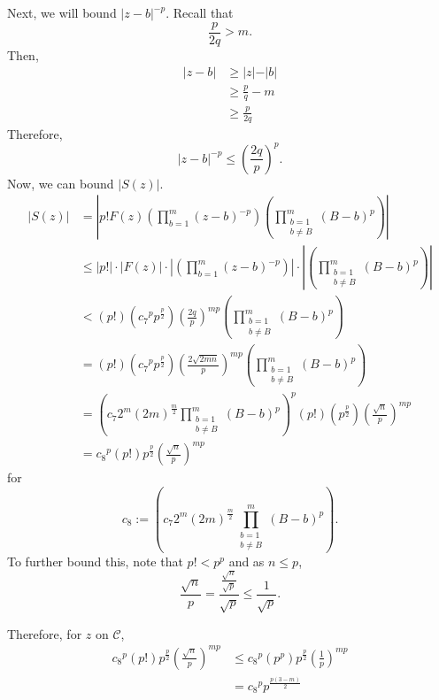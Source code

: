 \documentclass[a4paper, 11pt]{book}
\begin{document}
Next, we will bound ${\vert z - b \vert}^{-p}$. Recall that \[\frac{p}{2q} > m.\] Then,
\begin{align*}
    \vert z - b \vert &\geq \vert z \vert - \vert b \vert \\
                      &\geq \frac{p}{q} - m \\
                      &\geq \frac{p}{2q}
\end{align*}
Therefore, \[{\vert z - b \vert}^{-p} \leq {\left(\frac{2q}{p}\right)}^{p}.\] Now, we can bound $\vert S(z) \vert$.
\begin{align*}
    \vert S(z) \vert &= \left\vert p! F(z) \left(\prod\limits_{b=1}^{m} {(z - b)}^{-p}\right)\left(\prod\limits_{\substack {b = 1 \\ b \neq B}}^{m} {(B - b)}^{p}\right) \right\vert \\
                     &\leq \left\vert p!\right\vert \cdot \left\vert F(z)\right\vert \cdot \left\vert \left(\prod\limits_{b=1}^{m} {(z - b)}^{-p}\right)\right\vert \cdot \left\vert \left(\prod\limits_{\substack {b = 1 \\ b \neq B}}^{m} {(B - b)}^{p}\right) \right\vert \\
                     &< (p!)\left({c_7}^{p}{p}^{\frac{p}{2}}\right){\left(\frac{2q}{p}\right)}^{mp}\left(\prod\limits_{\substack {b = 1 \\ b \neq B}}^{m} {(B - b)}^{p}\right) \\
                     &= (p!)\left({c_7}^{p}{p}^{\frac{p}{2}}\right){\left(\frac{2\sqrt{2mn}}{p}\right)}^{mp}\left(\prod\limits_{\substack {b = 1 \\ b \neq B}}^{m} {(B - b)}^{p}\right) \\
                     &= {\left(c_{7}2^{m}{(2m)}^{\frac{m}{2}} \prod\limits_{\substack {b = 1 \\ b \neq B}}^{m} {(B - b)}^{p}\right)}^{p}(p!)\left(p^{\frac{p}{2}}\right){\left(\frac{\sqrt{n}}{p}\right)}^{mp} \\
                     &= {c_8}^{p}(p!)p^{\frac{p}{2}}{\left(\frac{\sqrt{n}}{p}\right)}^{mp} 
\end{align*}
for \[c_8 := \left(c_{7}2^{m}{(2m)}^{\frac{m}{2}} \prod\limits_{\substack {b = 1 \\ b \neq B}}^{m} {(B - b)}^{p}\right).\] To further bound this, note that $p! < p^{p}$ and as $n \leq p$, \[\frac{\sqrt{n}}{p} = \frac{\frac{\sqrt{n}}{\sqrt{p}}}{\sqrt{p}} \leq \frac{1}{\sqrt{p}}.\]

Therefore, for $z$ on $\mathcal{C}$,
\begin{align*}
    {c_8}^{p}(p!)p^{\frac{p}{2}}{\left(\frac{\sqrt{n}}{p}\right)}^{mp} &\leq {c_8}^{p}(p^{p})p^{\frac{p}{2}}{\left(\frac{1}{p}\right)}^{mp} \\
                                                                       &= {c_8}^{p}p^{\frac{p(3-m)}{2}}
\end{align*}
\end{document}
